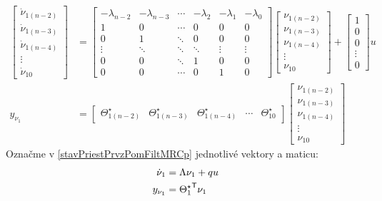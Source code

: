 \documentclass[a4paper, 10pt, ]{article}
\begin{document}
\begin{subequations} \label{stavPriestPrvzPomFiltMRCp}
	\begin{align}
		\begin{bmatrix}
			\dot{\nu}_{1(n-2)} \\
			\dot{\nu}_{1(n-3)} \\
			\dot{\nu}_{1(n-4)} \\
			\vdots \\
			\dot{\nu}_{10}
		\end{bmatrix}
		&=
		\begin{bmatrix}
			-\lambda_{n-2} & -\lambda_{n-3} &  \cdots & -\lambda_2 & -\lambda_1 & -\lambda_0\\
			1 & 0 &  \cdots & 0 & 0 & 0  \\
			0 & 1 & \ddots & 0 & 0 & 0 \\
			\vdots & \ddots & \ddots & \ddots & \vdots & \vdots \\
			0 & 0 & \ddots & 1 &  0 & 0 \\
			0 & 0 & \cdots & 0 &  1 & 0
		\end{bmatrix}
		\begin{bmatrix}
			\nu_{1(n-2)} \\
			\nu_{1(n-3)} \\
			\nu_{1(n-4)} \\
			\vdots \\
			\nu_{10}
		\end{bmatrix}
		+
		\begin{bmatrix}
			1 \\
			0 \\
			0 \\
			\vdots \\
			0
		\end{bmatrix}
		u
		\\
		y_{\nu_1}
		&=
		\begin{bmatrix}
			\Theta_{1(n-2)}^\star  &
			\Theta_{1(n-3)}^\star  &
			\Theta_{1(n-4)}^\star  &
			\cdots &
			\Theta_{10}^\star
		\end{bmatrix}
		\begin{bmatrix}
			\nu_{1(n-2)} \\
			\nu_{1(n-3)} \\
			\nu_{1(n-4)} \\
			\vdots \\
			\nu_{10}
		\end{bmatrix}
	\end{align}
\end{subequations}
Označme v \eqref{stavPriestPrvzPomFiltMRCp} jednotlivé vektory a maticu:
\begin{subequations}
	\begin{align}
		\dot \nu_1 &= \Lambda \nu_1 + q u \\
		y_{\nu_1} &= {\Theta_1^\star}^{\mathsf{T}} \nu_1
	\end{align}
\end{subequations}
\end{document}
